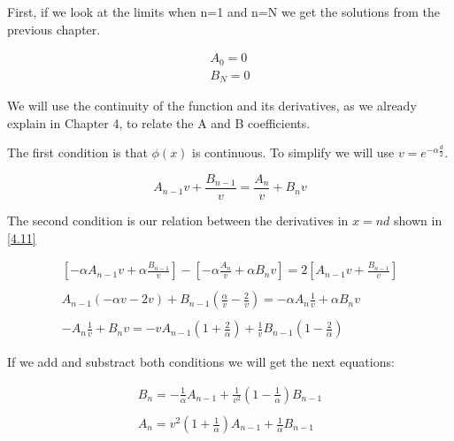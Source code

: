 First, if we look at the limits when n=1 and n=N we get the solutions from the previous chapter.

\begin{equation}
  \label{5.4}
  \begin{array}{l}
    A_0 = 0 \\
    B_N = 0
  \end{array}
\end{equation}

We will use the continuity of the function and its derivatives, as we already explain in Chapter 4, to relate the A and B coefficients.

The first condition is that $\phi(x)$ is continuous. To simplify we will use $v = e^{-\alpha\frac{d}{2}}$.

\begin{equation}
  \label{5.5}
  A_{n-1}v+\frac{B_{n-1}}{v} = \frac{A_n}{v}+B_n v
\end{equation}

The second condition is our relation between the derivatives in $x=nd$ shown in \ref{4.11}

\begin{equation}
  \label{5.6}
  \begin{array}{l}
    [-\alpha A_{n-1} v + \alpha \frac{B_{n-1}}{v}]-[-\alpha\frac{A_n}{v}+\alpha B_n v] = 2[A_{n-1}v+\frac{B_{n-1}}{v}]
    \\

    \\
    A_{n-1}(-\alpha v-2v)+B_{n-1}(\frac{\alpha}{v}-\frac{2}{v}) = -\alpha A_n \frac{1}{v}+\alpha B_n v
    \\

    \\
    -A_n\frac{1}{v} + B_n v = -vA_{n-1}(1+\frac{2}{\alpha})+\frac{1}{v}B_{n-1}(1-\frac{2}{\alpha})
  \end{array}
\end{equation}

If we add and substract both conditions we will get the next equations:

\begin{equation}
  \label{5.7}
  \begin{array}{l}
    B_n = -\frac{1}{\alpha} A_{n-1} + \frac{1}{v^2}(1-\frac{1}{\alpha}) B_{n-1}
    \\

    \\
    A_n = v^2(1+\frac{1}{\alpha})A_{n-1} + \frac{1}{\alpha} B_{n-1}
  \end{array}
\end{equation}

